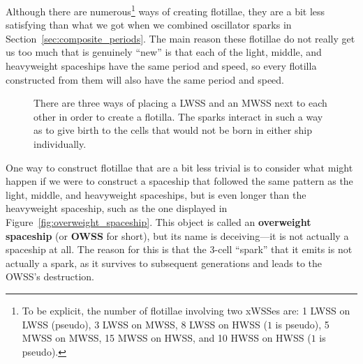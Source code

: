 Although there are numerous\footnote{To be explicit, the number of flotillae involving two xWSSes are: 1 LWSS on LWSS (pseudo), 3 LWSS on MWSS, 8 LWSS on HWSS ($1$ is pseudo), 5 MWSS on MWSS, 15 MWSS on HWSS, and 10 HWSS on HWSS ($1$ is pseudo).} ways of creating flotillae, they are a bit less satisfying than what we got when we combined oscillator sparks in Section~\ref{sec:composite_periods}. The main reason these flotillae do not really get us too much that is genuinely ``new'' is that each of the light, middle, and heavyweight spaceships have the same period and speed, so every flotilla constructed from them will also have the same period and speed.

\begin{figure}[!htb]
	\centering
	\begin{minipage}{.28\textwidth}
		\centering
	\end{minipage} \hfill %
	\begin{minipage}{.37\textwidth}
		\centering
	\end{minipage} \hfill %
	\begin{minipage}{.28\textwidth}
		\centering
	\end{minipage}
	\caption{There are three ways of placing a LWSS and an MWSS next to each other in order to create a flotilla. The  sparks interact in such a way as to give birth to the  cells that would not be born in either ship individually.}\label{fig:lwss_mwss_flotillae}
\end{figure}

One way to construct flotillae that are a bit less trivial is to consider what might happen if we were to construct a spaceship that followed the same pattern as the light, middle, and heavyweight spaceships, but is even longer than the heavyweight spaceship, such as the one displayed in Figure~\ref{fig:overweight_spaceship}. This object is called an \textbf{overweight spaceship} (or \textbf{OWSS} for short), but its name is deceiving---it is not actually a spaceship at all. The reason for this is that the $3$-cell ``spark'' that it emits is not actually a spark, as it survives to subsequent generations and leads to the OWSS's destruction.

